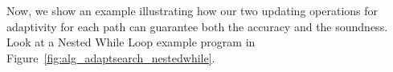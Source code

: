  Now, we show an example illustrating how our two updating operations for adaptivity 
 for each path can guarantee both the accuracy and the soundness. 
 Look at a Nested While Loop example program in Figure~\ref{fig:alg_adaptsearch_nestedwhile}.
